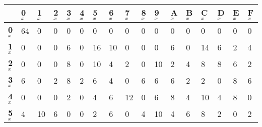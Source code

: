 \begin{longtable}[c]{|l|l|l|l|l|l|l|l|l|l|l|l|l|l|l|l|l|}
\hline
                & \textbf{0$_x$} & \textbf{1$_x$} & \textbf{2$_x$} & \textbf{3$_x$} & \textbf{4$_x$} & \textbf{5$_x$} & \textbf{6$_x$} & \textbf{7$_x$} & \textbf{8$_x$} & \textbf{9$_x$} & \textbf{A$_x$} & \textbf{B$_x$} & \textbf{C$_x$} & \textbf{D$_x$} & \textbf{E$_x$} & \textbf{F$_x$} \\ \hline
\endfirsthead
%
\endhead
%
\textbf{0$_x$}  & 64             & 0              & 0              & 0              & 0              & 0              & 0              & 0              & 0              & 0              & 0              & 0              & 0              & 0              & 0              & 0              \\ \hline
\textbf{1$_x$}  & 0              & 0              & 0              & 6              & 0              & 16             & 10             & 0              & 0              & 0              & 6              & 0              & 14             & 6              & 2              & 4              \\ \hline
\textbf{2$_x$}  & 0              & 0              & 0              & 8              & 0              & 10             & 4              & 2              & 0              & 10             & 2              & 4              & 8              & 8              & 6              & 2              \\ \hline
\textbf{3$_x$}  & 6              & 0              & 2              & 8              & 2              & 6              & 4              & 0              & 6              & 6              & 6              & 2              & 2              & 0              & 8              & 6              \\ \hline
\textbf{4$_x$}  & 0              & 0              & 0              & 2              & 0              & 4              & 6              & 12             & 0              & 6              & 8              & 4              & 10             & 4              & 8              & 0              \\ \hline
\textbf{5$_x$}  & 4              & 10             & 6              & 0              & 0              & 2              & 6              & 0              & 4              & 10             & 4              & 6              & 8              & 2              & 0              & 2              \\ \hline

\end{longtable}
